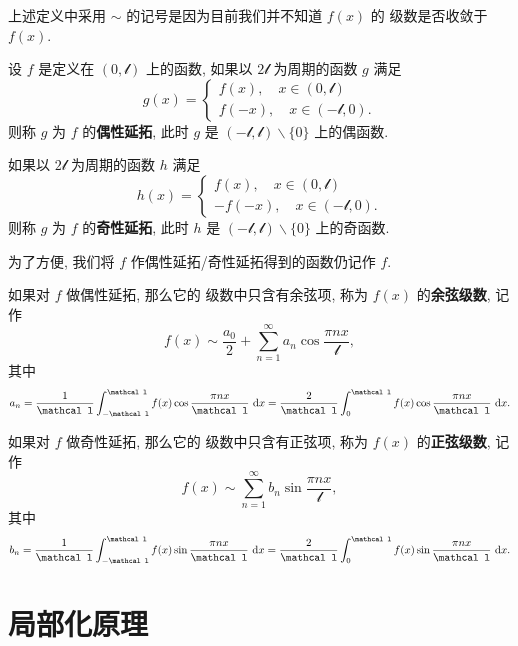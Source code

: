 \begin{remark}
	上述定义中采用 $\sim$ 的记号是因为目前我们并不知道 $f(x)$ 的 \fly 级数是否收敛于 $f(x)$.
\end{remark}

\begin{definition}
	设 $f$ 是定义在 $(0,\mathcal l)$ 上的函数, 如果以 $2\mathcal l$ 为周期的函数 $g$ 满足 $$g(x) = \left\{\begin{array}{c}
		f(x),\quad x\in(0,\mathcal l) \\
		f(-x),\quad x\in (-\mathcal l,0).
	\end{array}\right.$$
	则称 $g$ 为 $f$ 的\textbf{偶性延拓}, 此时 $g$ 是 $(-\mathcal l,\mathcal l)\backslash\{0\}$ 上的偶函数.

	如果以 $2\mathcal l$ 为周期的函数 $h$ 满足 $$h(x) = \left\{\begin{array}{c}
		f(x),\quad x\in(0,\mathcal l) \\
		-f(-x),\quad x\in (-\mathcal l,0).
	\end{array}\right.$$
	则称 $g$ 为 $f$ 的\textbf{奇性延拓}, 此时 $h$ 是 $(-\mathcal l,\mathcal l)\backslash\{0\}$ 上的奇函数.
\end{definition}

为了方便, 我们将 $f$ 作偶性延拓/奇性延拓得到的函数仍记作 $f$.

\begin{definition}
	如果对 $f$ 做偶性延拓, 那么它的 \fly 级数中只含有余弦项, 称为 $f(x)$ 的\textbf{余弦级数}, 记作 $$f(x)\sim \frac{a_0} 2+\sum\limits_{n=1}^{\infty} a_n\cos\frac{\pi n x}{\mathcal l},$$ 其中 \begin{equation}
		a_n=\frac 1 {\mathcal l}\int_{-\mathcal l}^{\mathcal l} f(x)\cos\frac{\pi n x}{\mathcal l}\td x=\frac 2 {\mathcal l}\int_0^{\mathcal l} f(x)\cos\frac{\pi n x}{\mathcal l}\td x.
	\end{equation}

	如果对 $f$ 做奇性延拓, 那么它的 \fly 级数中只含有正弦项, 称为 $f(x)$ 的\textbf{正弦级数}, 记作 $$f(x)\sim \sum\limits_{n=1}^{\infty} b_n\sin\frac{\pi n x}{\mathcal l},$$ 其中 \begin{equation}
		b_n=\frac 1 {\mathcal l}\int_{-\mathcal l}^{\mathcal l} f(x)\sin\frac{\pi n x}{\mathcal l}\td x=\frac 2 {\mathcal l}\int_0^{\mathcal l} f(x)\sin\frac{\pi n x}{\mathcal l}\td x.
	\end{equation}
\end{definition}


\section{局部化原理}

